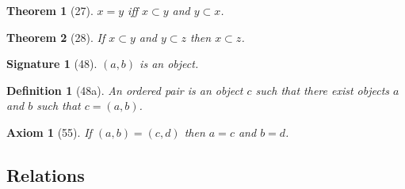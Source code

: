 \documentclass{scrartcl}
\newenvironment{forthel}{\begin{leftbar}}{\end{leftbar}}
\newtheorem*{axiom}{Axiom}
\newtheorem*{theorem}{Theorem}
\newtheorem*{definition}{Definition}
\newtheorem*{signature}{Signature}
\newcommand{\op}[2]{({#1},{#2})}
\begin{document}
\begin{forthel}
\begin{theorem}[27] $x = y$ iff $x \subset y$ and $y \subset x$.
\end{theorem}

\begin{theorem}[28] If $x \subset y$ and $y \subset z$ then $x \subset z$.
\end{theorem}

\begin{signature}[48] $\op{a}{b}$ is an object.
\end{signature}

\begin{definition}[48a]
An \emph{ordered pair} is an object $c$ such that there exist
objects $a$ and $b$ such that $c = \op{a}{b}$.
\end{definition}

\begin{axiom}[55] If $\op{a}{b}=\op{c}{d}$ then
$a = c$ and $b = d$.
\end{axiom}

\end{forthel}

\subsection{Relations}
\end{document}
